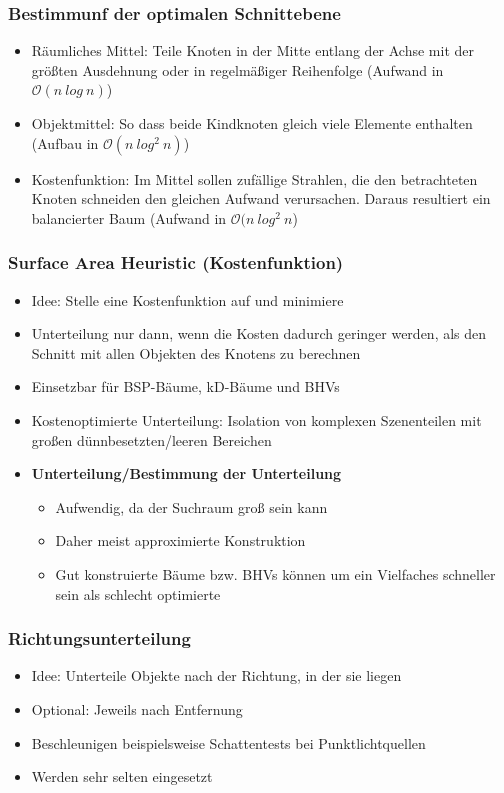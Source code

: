 \subsubsection{Bestimmunf der optimalen Schnittebene}
\begin{itemize}
	\item Räumliches Mittel: Teile Knoten in der Mitte entlang der Achse mit der größten Ausdehnung oder in regelmäßiger Reihenfolge (Aufwand in \(\mathcal{O}(n~log~n)\))
	\item Objektmittel: So dass beide Kindknoten gleich viele Elemente enthalten (Aufbau in \(\mathcal{O}(n~log^2~n)\))
	\item Kostenfunktion: Im Mittel sollen zufällige Strahlen, die den betrachteten Knoten schneiden den gleichen Aufwand verursachen. Daraus resultiert ein balancierter Baum (Aufwand in \(\mathcal{O}(n~log^2~n\))
\end{itemize}

\subsubsection{Surface Area Heuristic (Kostenfunktion)}
\begin{itemize}
	\item Idee: Stelle eine Kostenfunktion auf und minimiere
	\item Unterteilung nur dann, wenn die Kosten dadurch geringer werden, als den Schnitt mit allen Objekten des Knotens zu berechnen
	\item Einsetzbar für BSP-Bäume, kD-Bäume und BHVs
	\item Kostenoptimierte Unterteilung: Isolation von komplexen Szenenteilen mit großen dünnbesetzten/leeren Bereichen
	\item \textbf{Unterteilung/Bestimmung der Unterteilung}
	\begin{itemize}
		\item Aufwendig, da der Suchraum groß sein kann
		\item Daher meist approximierte Konstruktion
		\item Gut konstruierte Bäume bzw. BHVs können um ein Vielfaches schneller sein als schlecht optimierte
	\end{itemize}
\end{itemize}

\subsubsection{Richtungsunterteilung}
\begin{itemize}
	\item Idee: Unterteile Objekte nach der Richtung, in der sie liegen
	\item Optional: Jeweils nach Entfernung
	\item Beschleunigen beispielsweise Schattentests bei Punktlichtquellen
	\item Werden sehr selten eingesetzt
\end{itemize}

